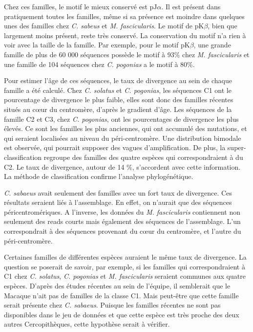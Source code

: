 \documentclass[12pt,a4paper]{article}
\begin{document}
	Chez ces familles, le motif le mieux conservé est pJ$\alpha$. Il est présent dans pratiquement toutes les familles, même si sa présence est moindre dans quelques unes des familles chez \textit{C. sabeus} et \textit{M. fascicularis}. Le motif de pK$\beta$, bien que largement moins présent, reste très conservé. La conservation du motif n'a rien à voir avec la taille de la famille. Par exemple, pour le motif pK$\beta$, une grande famille de plus de 60 000 séquences possède le motif à 93\% chez \textit{M. fascicularis} et une famille de 104 séquences chez \textit{C. pogonias} a le motif à 80\%.
	
		Pour estimer l'âge de ces séquences, le taux de divergence au sein de chaque famille a été calculé. Chez \textit{C. solatus} et \textit{C. pogonias}, les séquences C1 ont le pourcentage de divergence le plus faible, elles sont donc des familles récentes situés au cœur du centromère, d'après le gradient d'âge. Les séquences de la famille C2 et C3, chez \textit{C. pogonias}, ont les pourcentages de divergence les plus élevés. Ce sont les familles les plus anciennes, qui ont accumulé des mutations, et qui seraient localisées au niveau du péri-centromère.  Une distribution bimodale est observée, qui pourrait supposer des vagues d'amplification. De plus, la super-classification regroupe des familles des quatre espèces qui correspondraient à du C2. Le taux de divergence, autour de 14 \%, s'accordent avec cette information.  La méthode de classification confirme l'analyse phylogénétique.
	
	 \textit{C. sabaeus} avait seulement  des familles avec un fort taux de divergence. Ces résultats seraient liés à l'assemblage. En effet, on n'aurait que des séquences péricentromériques. A l'inverse, les données du \textit{M. fascicularis} contiennent non seulement des reads courts mais également des séquences de l'assemblage. L'un correspondrait à des séquences provenant du cœur du centromère, et l'autre du péri-centromère. 

	Certaines familles de différentes espèces auraient le même taux de divergence. La question se poserait de savoir, par exemple, si les familles qui correspondraient à C1 chez \textit{C. solatus}, \textit{C. pogonias} et \textit{M. fascicularis} seraient communes aux quatre espèces. D'après des études récentes au sein de l'équipe, il semblerait que le Macaque n'ait pas de familles de la classe C1. Mais peut-être que cette famille serait présente chez \textit{C. sabaeus}. Puisque les familles récentes ne sont pas disponibles dans le jeu de données et que cette espèce est très proche des deux autres Cercopithèques, cette hypothèse serait à vérifier.
\end{document}
